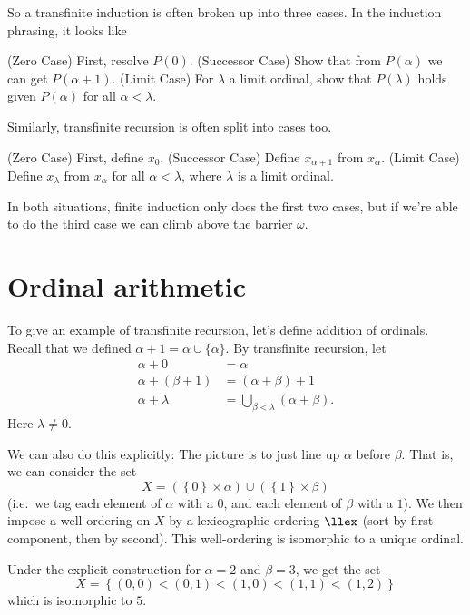 So a transfinite induction is often broken up into three cases.
In the induction phrasing, it looks like
\begin{itemize}
	\ii (Zero Case) First, resolve $P(0)$.
	\ii (Successor Case) Show that from $P(\alpha)$ we can get $P(\alpha+1)$.
	\ii (Limit Case) For $\lambda$ a limit ordinal,
	show that $P(\lambda)$ holds given $P(\alpha)$ for all $\alpha < \lambda$.
\end{itemize}
Similarly, transfinite recursion is often split into cases too.
\begin{itemize}
	\ii (Zero Case) First, define $x_0$.
	\ii (Successor Case) Define $x_{\alpha+1}$ from $x_\alpha$.
	\ii (Limit Case) Define $x_\lambda$ from $x_\alpha$ for all $\alpha < \lambda$,
	where $\lambda$ is a limit ordinal.
\end{itemize}
In both situations, finite induction only does the first two cases,
but if we're able to do the third case we can climb above the barrier $\omega$.

\section{Ordinal arithmetic}
To give an example of transfinite recursion, let's define addition of ordinals.
Recall that we defined $\alpha+1 = \alpha \cup \{\alpha\}$.
By transfinite recursion, let
\begin{align*}
	\alpha + 0 &= \alpha \\
	\alpha + (\beta + 1) &= (\alpha + \beta) + 1 \\
	\alpha + \lambda &= \bigcup_{\beta < \lambda} (\alpha + \beta).
\end{align*}
Here $\lambda \neq 0$.

We can also do this explicitly:
The picture is to just line up $\alpha$ before $\beta$.
That is, we can consider the set
\[
	X =
	\left( \left\{ 0 \right\} \times \alpha \right)
	\cup
	\left( \left\{ 1 \right\} \times \beta \right)
\]
(i.e.\ we tag each element of $\alpha$ with a $0$, and
each element of $\beta$ with a $1$).
We then impose a well-ordering on $X$ by a lexicographic ordering $\llex$
(sort by first component, then by second).
This well-ordering is isomorphic to a unique ordinal.
\begin{example}
	[$2+3=5$]
	Under the explicit construction for $\alpha = 2$ and $\beta = 3$, we get the set
	\[
		X = \left\{ (0,0) < (0,1) < (1,0) < (1,1) < (1,2) \right\}
	\]
	which is isomorphic to $5$.
\end{example}

